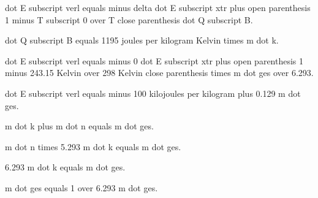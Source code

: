dot E subscript verl equals minus delta dot E subscript xtr plus open parenthesis 1 minus T subscript 0 over T close parenthesis dot Q subscript B.

dot Q subscript B equals 1195 joules per kilogram Kelvin times m dot k.

dot E subscript verl equals minus 0 dot E subscript xtr plus open parenthesis 1 minus 243.15 Kelvin over 298 Kelvin close parenthesis times m dot ges over 6.293.

dot E subscript verl equals minus 100 kilojoules per kilogram plus 0.129 m dot ges.

m dot k plus m dot n equals m dot ges.

m dot n times 5.293 m dot k equals m dot ges.

6.293 m dot k equals m dot ges.

m dot ges equals 1 over 6.293 m dot ges.